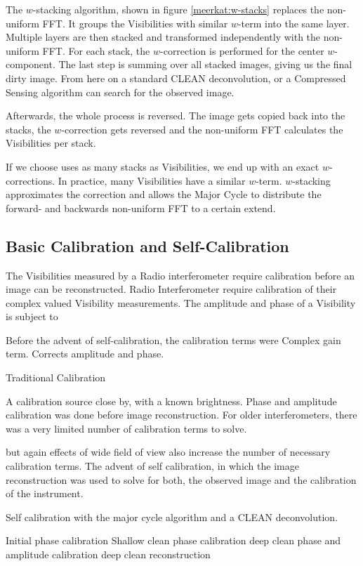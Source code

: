 The $w$-stacking algorithm, shown in figure \ref{meerkat:w-stacks} replaces the non-uniform FFT. It groups the Visibilities with similar $w$-term into the same layer. Multiple layers are then stacked and transformed independently with the non-uniform FFT. For each stack, the $w$-correction is performed for the center $w$-component. The last step is summing over all stacked images, giving us the final dirty image. From here on a standard CLEAN deconvolution, or a Compressed Sensing algorithm can search for the observed image.

Afterwards, the whole process is reversed. The image gets copied back into the stacks, the $w$-correction gets reversed and the non-uniform FFT calculates the Visibilities per stack.

If we choose uses as many stacks as Visibilities, we end up with an exact $w$-corrections. In practice, many Visibilities have a similar $w$-term. $w$-stacking approximates the correction and allows the Major Cycle to distribute the forward- and backwards non-uniform FFT to a certain extend.

\subsection{Basic Calibration and Self-Calibration}
The Visibilities measured by a Radio interferometer require calibration before an image can be reconstructed.
Radio Interferometer require calibration of their complex valued Visibility measurements. The amplitude and phase of a Visibility is subject to 

Before the advent of self-calibration, the calibration terms were 
Complex gain term. Corrects amplitude and phase. 

Traditional Calibration

A calibration source close by, with a known brightness. Phase and amplitude calibration was done before image reconstruction. For older interferometers, there was a very limited number of calibration terms to solve.


but again effects of wide field of view also increase the number of necessary calibration terms. The advent of self calibration, in which the image reconstruction was used to solve for both, the observed image and the calibration of the instrument.

Self calibration with the major cycle algorithm and a CLEAN deconvolution.

Initial phase calibration
Shallow clean
phase calibration
deep clean
phase and amplitude calibration
deep clean
reconstruction







